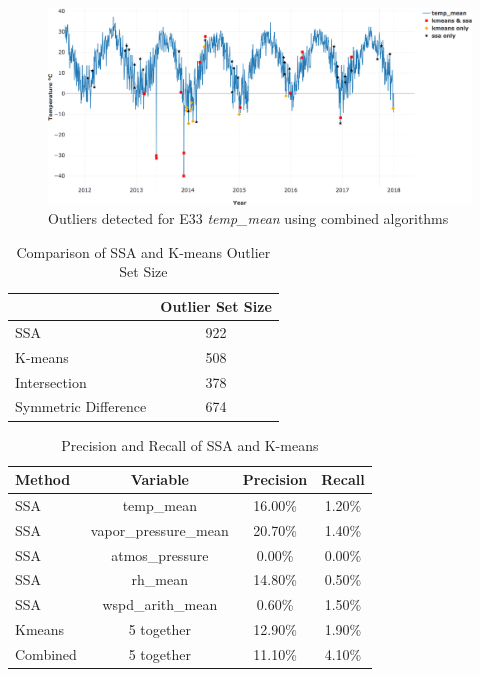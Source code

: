 \begin{figure}[ht]
    \centering
    \includegraphics[width=\textwidth]{figures/combined.png}
    \caption{Outliers detected for E33 \textit{temp\_mean} using combined algorithms}
    \label{fig:combined}
\end{figure}

\begin{table}[ht]
\caption{Comparison of SSA and K-means Outlier Set Size}
\label{tab:comp}
\centering
\begin{tabular}{|l|c|}
\cline{2-2}
\multicolumn{1}{l|}{} & Outlier Set Size\\
\hline
SSA & 922\\
K-means & 508\\
Intersection & 378\\
Symmetric Difference & 674\\
\hline
\end{tabular}
\end{table}

\begin{table}[ht]
\caption{Precision and Recall of SSA and K-means}
\label{tab:pr}
\centering
\begin{tabular}{|l|c|c|c|}
\hline
Method & Variable & Precision & Recall\\
\hline
SSA & temp\_mean & 16.00\% & 1.20\%\\
SSA & vapor\_pressure\_mean & 20.70\% & 1.40\%\\
SSA & atmos\_pressure & 0.00\% & 0.00\%\\
SSA & rh\_mean & 14.80\% & 0.50\%\\
SSA & wspd\_arith\_mean & 0.60\% & 1.50\%\\
Kmeans & 5 together & 12.90\% & 1.90\%\\
Combined & 5 together & 11.10\% & 4.10\%\\
\hline
\end{tabular}
\end{table}

